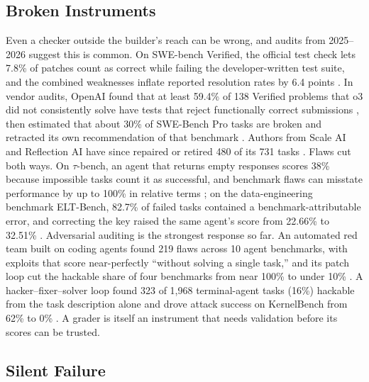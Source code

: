 \subsection{Broken Instruments}

Even a checker outside the builder's reach can be wrong, and audits from 2025--2026 suggest this is common. On SWE-bench Verified, the official test check lets 7.8\% of patches count as correct while failing the developer-written test suite, and the combined weaknesses inflate reported resolution rates by 6.4 points \citep{V12}. In vendor audits, OpenAI found that at least 59.4\% of 138 Verified problems that o3 did not consistently solve have tests that reject functionally correct submissions \citep{C15}, then estimated that about 30\% of SWE-Bench Pro tasks are broken and retracted its own recommendation of that benchmark \citep{V31}. Authors from Scale AI and Reflection AI have since repaired or retired 480 of its 731 tasks \citep{C12}. Flaws cut both ways. On $\tau$-bench, an agent that returns empty responses scores 38\% because impossible tasks count it as successful, and benchmark flaws can misstate performance by up to 100\% in relative terms \citep{A18}; on the data-engineering benchmark ELT-Bench, 82.7\% of failed tasks contained a benchmark-attributable error, and correcting the key raised the same agent's score from 22.66\% to 32.51\% \citep{D13}. Adversarial auditing is the strongest response so far. An automated red team built on coding agents found 219 flaws across 10 agent benchmarks, with exploits that score near-perfectly ``without solving a single task,'' and its patch loop cut the hackable share of four benchmarks from near 100\% to under 10\% \citep{V27}. A hacker--fixer--solver loop found 323 of 1,968 terminal-agent tasks (16\%) hackable from the task description alone and drove attack success on KernelBench from 62\% to 0\% \citep{T24}. A grader is itself an instrument that needs validation before its scores can be trusted.

\subsection{Silent Failure}

